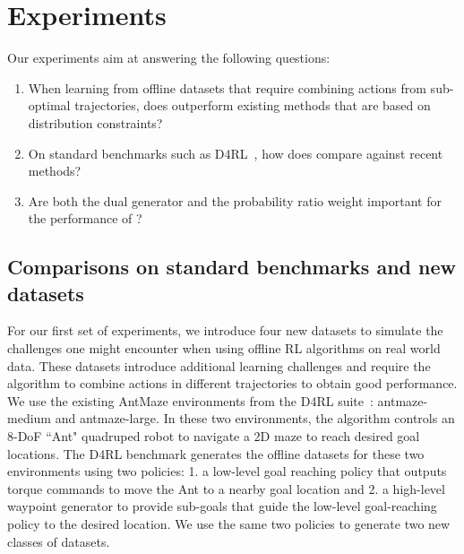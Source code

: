 \section{Experiments}
\label{sec:dasco_exp}



Our experiments aim at answering the following questions: 
\begin{enumerate}
    \item When learning from offline datasets that require combining actions from sub-optimal trajectories, does \name{} outperform existing methods that are based on distribution constraints? 
    \item On standard benchmarks such as D4RL~\cite{d4rl}, how does \name{} compare against recent methods? 
    \item Are both the dual generator and the probability ratio weight important for the performance of \name{}?
\end{enumerate}

\subsection{Comparisons on standard benchmarks and new datasets}

For our first set of experiments, we introduce four new datasets to simulate the challenges one might encounter when using offline RL algorithms on real world data. These datasets introduce additional learning challenges and require the algorithm to combine actions in different trajectories to obtain good performance. We use the existing AntMaze environments from the D4RL suite~\cite{d4rl}: antmaze-medium and antmaze-large. In these two environments, the algorithm controls an 8-DoF ``Ant" quadruped robot to navigate a 2D maze to reach desired goal locations. 
The D4RL benchmark generates the offline datasets for these two environments using two policies: 1. a low-level goal reaching policy that outputs torque commands to move the Ant to a nearby goal location and 2. a high-level waypoint generator to provide sub-goals that guide the low-level goal-reaching policy to the desired location.
We use the same two policies to generate two new classes of datasets. 

